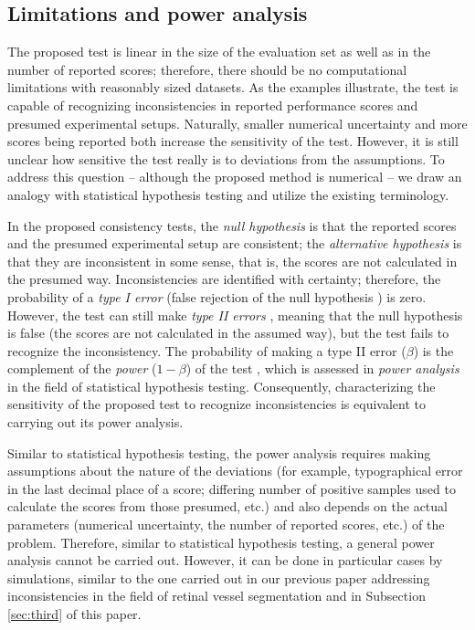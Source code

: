 \documentclass[3p, times]{elsarticle}
\begin{document}
\subsection{Limitations and power analysis}
\label{sec:indpower}

The proposed test is linear in the size of the evaluation set as well as in the number of reported scores; therefore, there should be no computational limitations with reasonably sized datasets. As the examples illustrate, the test is capable of recognizing inconsistencies in reported performance scores and presumed experimental setups. Naturally, smaller numerical uncertainty and more scores being reported both increase the sensitivity of the test. However, it is still unclear how sensitive the test really is to deviations from the assumptions. To address this question -- although the proposed method is numerical -- we draw an analogy with statistical hypothesis testing and utilize the existing terminology.

In the proposed consistency tests, the \emph{null hypothesis} is that the reported scores and the presumed experimental setup are consistent; the \emph{alternative hypothesis} is that they are inconsistent in some sense, that is, the scores are not calculated in the presumed way. Inconsistencies are identified with certainty; therefore, the probability of a \emph{type I error} (false rejection of the null hypothesis \cite{statdict}) is zero. However, the test can still make \emph{type II errors} \cite{statdict}, meaning that the null hypothesis is false (the scores are not calculated in the assumed way), but the test fails to recognize the inconsistency. The probability of making a type II error ($\beta$) is the complement of the \emph{power} ($1 - \beta$) of the test \cite{statdict}, which is assessed in \emph{power analysis} \cite{statdict} in the field of statistical hypothesis testing. Consequently, characterizing the sensitivity of the proposed test to recognize inconsistencies is equivalent to carrying out its power analysis.

Similar to statistical hypothesis testing, the power analysis requires making assumptions about the nature of the deviations (for example, typographical error in the last decimal place of a score; differing number of positive samples used to calculate the scores from those presumed, etc.) and also depends on the actual parameters (numerical uncertainty, the number of reported scores, etc.) of the problem. Therefore, similar to statistical hypothesis testing, a general power analysis cannot be carried out. However, it can be done in particular cases by simulations, similar to the one carried out in our previous paper addressing inconsistencies in the field of retinal vessel segmentation \cite{vessel} and in Subsection \ref{sec:third} of this paper.
\end{document}
